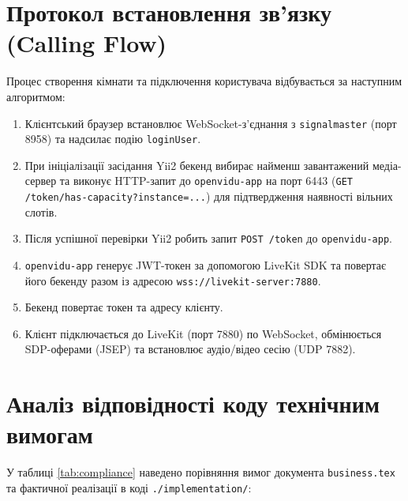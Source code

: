 \documentclass{article}
\begin{document}
\section{Протокол встановлення зв'язку (Calling Flow)}
Процес створення кімнати та підключення користувача відбувається за наступним алгоритмом:
\begin{enumerate}
    \item Клієнтський браузер встановлює WebSocket-з'єднання з \texttt{signalmaster} (порт 8958) та надсилає подію \texttt{loginUser}.
    \item При ініціалізації засідання Yii2 бекенд вибирає найменш завантажений медіа-сервер та виконує HTTP-запит до \texttt{openvidu-app} на порт 6443 (\texttt{GET /token/has-capacity?instance=...}) для підтвердження наявності вільних слотів.
    \item Після успішної перевірки Yii2 робить запит \texttt{POST /token} до \texttt{openvidu-app}.
    \item \texttt{openvidu-app} генерує JWT-токен за допомогою LiveKit SDK та повертає його бекенду разом із адресою \texttt{wss://livekit-server:7880}.
    \item Бекенд повертає токен та адресу клієнту.
    \item Клієнт підключається до LiveKit (порт 7880) по WebSocket, обмінюється SDP-оферами (JSEP) та встановлює аудіо/відео сесію (UDP 7882).
\end{enumerate}

\newpage

\section{Аналіз відповідності коду технічним вимогам}

У таблиці \ref{tab:compliance} наведено порівняння вимог документа \texttt{business.tex} та фактичної реалізації в коді \texttt{./implementation/}:
\end{document}
